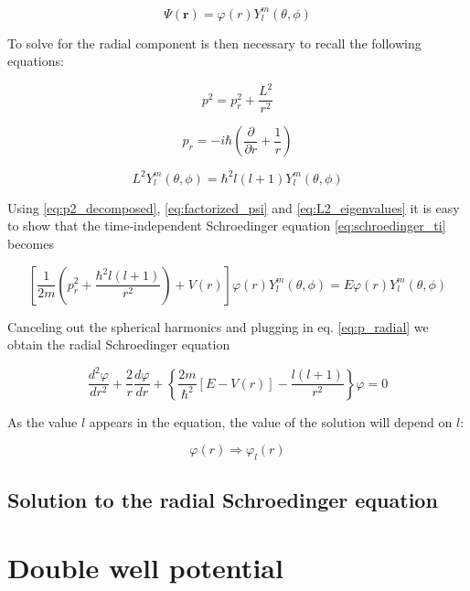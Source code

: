 \documentclass{article}
\begin{document}
\begin{equation}
\label{eq:factorized_psi}
\Psi(\bm{r}) = \varphi(r) Y_{l}^m(\theta,\phi)
\end{equation}

To solve for the radial component is then necessary to recall the following equations:

\begin{equation}
\label{eq:p2_decomposed}
p^2 = p_{r}^2 + \frac{L^2}{r^2}
\end{equation}

\begin{equation}
\label{eq:p_radial}
p_{r} = -i\hbar \left( \frac{\partial}{\partial r} + \frac{1}{r} \right)
\end{equation}

\begin{equation}
\label{eq:L2_eigenvalues}
L^2 Y_{l}^m(\theta, \phi) = \hbar^2 l(l+1) Y_{l}^m(\theta, \phi)
\end{equation}

Using \eqref{eq:p2_decomposed}, \eqref{eq:factorized_psi} and \eqref{eq:L2_eigenvalues} 
it is easy to show that the time-independent Schroedinger equation \eqref{eq:schroedinger_ti} becomes

\begin{equation}
\left[ \frac{1}{2m} \left( p_{r}^2 + \frac{\hbar^2 l(l+1)}{r^2} \right) + V(r) \right] \varphi(r) Y_{l}^m(\theta, \phi) = E \varphi(r) Y_{l}^m(\theta, \phi)
\end{equation}

Canceling out the spherical harmonics and plugging in eq. \eqref{eq:p_radial} we obtain the radial Schroedinger equation

\begin{equation}
\label{eq:schroedinger_radial}
\frac{d^2 \varphi}{dr^2} + \frac{2}{r} \frac{d\varphi}{dr} + \left\{ \frac{2m}{\hbar^2} \left[ E - V(r) \right] - \frac{l \left(l+1 \right)}{r^2} \right\} \varphi = 0
\end{equation}

As the value \(l\) appears in the equation, the value of the solution will depend on \(l\):

\[ \varphi(r) \Rightarrow \varphi_l(r) \]

\subsection{Solution to the radial Schroedinger equation}


\section{Double well potential}
\end{document}
